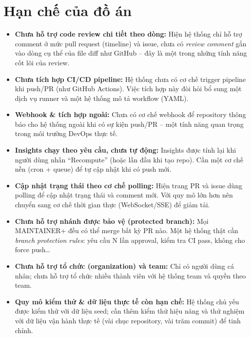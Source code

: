 \section{Hạn chế của đồ án}
\begin{itemize}
\item \textbf{Chưa hỗ trợ code review chi tiết theo dòng:} Hiện hệ thống chỉ hỗ trợ comment ở mức pull request (timeline) và issue, chưa có \textit{review comment} gắn vào dòng cụ thể của file diff như GitHub -- đây là một trong những tính năng cốt lõi của review.
\item \textbf{Chưa tích hợp CI/CD pipeline:} Hệ thống chưa có cơ chế trigger pipeline khi push/PR (như GitHub Actions). Việc tích hợp này đòi hỏi bổ sung một dịch vụ runner và một hệ thống mô tả workflow (YAML).
\item \textbf{Webhook \& tích hợp ngoài:} Chưa có cơ chế webhook để repository thông báo cho hệ thống ngoài khi có sự kiện push/PR -- một tính năng quan trọng trong môi trường DevOps thực tế.
\item \textbf{Insights chạy theo yêu cầu, chưa tự động:} Insights được tính lại khi người dùng nhấn ``Recompute'' (hoặc lần đầu khi tạo repo). Cần một cơ chế nền (cron + queue) để tự cập nhật khi có push mới.
\item \textbf{Cập nhật trạng thái theo cơ chế polling:} Hiện trang PR và issue dùng polling để cập nhật trạng thái và comment mới. Với quy mô lớn hơn nên chuyển sang cơ chế thời gian thực (WebSocket/SSE) để giảm tải.
\item \textbf{Chưa hỗ trợ nhánh được bảo vệ (protected branch):} Mọi MAINTAINER+ đều có thể merge bất kỳ PR nào. Một hệ thống thật cần \textit{branch protection rules}: yêu cầu N lần approval, kiểm tra CI pass, không cho force push\ldots
\item \textbf{Chưa hỗ trợ tổ chức (organization) và team:} Chỉ có người dùng cá nhân; chưa hỗ trợ tổ chức nhiều thành viên với hệ thống team và quyền theo team.
\item \textbf{Quy mô kiểm thử \& dữ liệu thực tế còn hạn chế:} Hệ thống chủ yếu được kiểm thử với dữ liệu seed; cần thêm kiểm thử hiệu năng và thử nghiệm với dữ liệu vận hành thực tế (vài chục repository, vài trăm commit) để tinh chỉnh.
\end{itemize}

